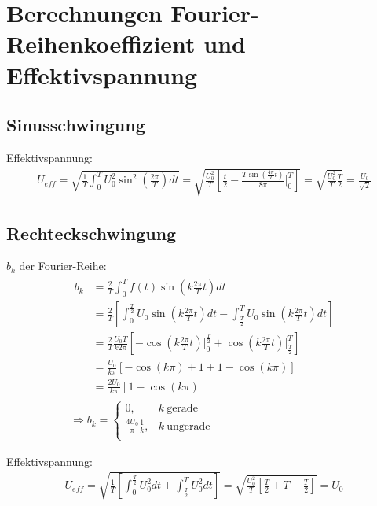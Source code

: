 

\chapter{Berechnungen Fourier-Reihenkoeffizient und Effektivspannung}
\label{app:Berechnung}

\section*{Sinusschwingung}
Effektivspannung:
\begin{gather}
    U_{eff} = \sqrt{\frac{1}{T}\int^T_0 U_0^2 \sin^2\left(\frac{2\pi}{T}\right) dt} = \sqrt{\frac{U_0^2}{T} \left[\frac{t}{2} - \frac{T\sin(\frac{4\pi}{T}t)}{8\pi}\bigg \vert^T_0 \right]} = \sqrt{\frac{U_0^2}{T}\frac{T}{2}} = \frac{U_0}{\sqrt{2}}
\end{gather}

\section*{Rechteckschwingung}
$b_k$ der Fourier-Reihe:
\begin{gather}
    \begin{aligned}
        b_k &= \frac{2}{T} \int^{T}_{0} f(t)\sin(k \frac{2\pi}{T} t)dt\\
            &= \frac{2}{T} \left[ \int^{\frac{T}{2}}_{0} U_0\sin(k \frac{2\pi}{T} t)dt - \int^{T}_{\frac{T}{2}} U_0\sin(k \frac{2\pi}{T} t)dt\right]\\
            &= \frac{2}{T}\frac{U_0T}{k2\pi} \left[-\cos(k \frac{2\pi}{T} t) \bigg \vert^{\frac{T}{2}}_{0} + \cos(k \frac{2\pi}{T} t) \bigg \vert^{T}_{\frac{T}{2}} \right]\\
            &= \frac{U_0}{k\pi} \left[-\cos(k\pi)+1 + 1 - \cos(k\pi)\right]\\
            &= \frac{2U_0}{k\pi}\left[1-\cos(k\pi)\right]
    \end{aligned}\\[0,5cm]
    \Rightarrow b_k =
    \begin{cases}
        0, & k~\text{gerade}\\
        \frac{4U_0}{\pi}\frac{1}{k}, & k~\text{ungerade}\\
    \end{cases}
\end{gather}

Effektivspannung:
\begin{gather}
    U_{eff} = \sqrt{\frac{1}{T}\left[\int^{\frac{T}{2}}_0 U_0^2dt + \int^T_{\frac{T}{2}} U_0^2 dt\right]} = \sqrt{\frac{U_0^2}{T}\left[\frac{T}{2}+T-\frac{T}{2}\right]} = U_0
\end{gather}


